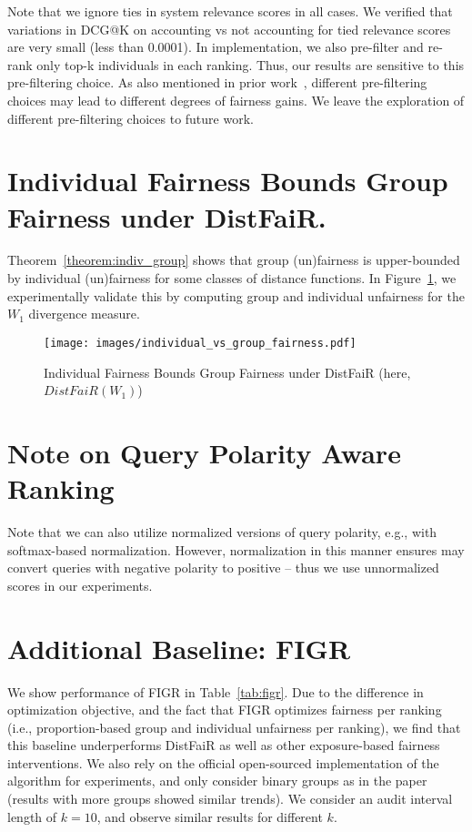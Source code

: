 Note that we ignore ties in system relevance scores in all cases. We verified that variations in DCG@K on accounting vs not accounting for tied relevance scores are very small (less than 0.0001). In implementation, we also pre-filter and re-rank only top-k individuals in each ranking. Thus,  our results are sensitive to this pre-filtering choice. As also mentioned in prior work~\cite{biega2018equity}, different pre-filtering choices may lead to different degrees of fairness gains. We leave the exploration of different pre-filtering choices to future work.


\section{Individual Fairness Bounds Group Fairness under DistFaiR.}
\label{sec:fairness_bounds}
Theorem~\ref{theorem:indiv_group} shows that group (un)fairness is upper-bounded by individual (un)fairness for some classes of distance functions. In Figure~\ref{fig:indiv_group}, we experimentally validate this by computing group and individual unfairness for the $W_1$ divergence measure.

\begin{figure}[ht!]
    \centering
    \texttt{[image: images/individual\_vs\_group\_fairness.pdf]}
    \caption{Individual Fairness Bounds Group Fairness under DistFaiR (here, $DistFaiR(W_1)$)}
    \label{fig:indiv_group}
\end{figure}


\section{Note on Query Polarity Aware Ranking}
Note that we can also utilize normalized versions of query polarity, e.g., with softmax-based normalization.  However, normalization in this manner ensures may convert queries with negative polarity to positive -- thus we use unnormalized scores in our experiments. 


\section{Additional Baseline: FIGR}

We show performance of FIGR in Table~\ref{tab:figr}. Due to the difference in optimization objective, and the fact that FIGR optimizes fairness per ranking (i.e., proportion-based group and individual unfairness per ranking), we find that this baseline underperforms DistFaiR as well as other exposure-based fairness interventions. We also rely on the official open-sourced implementation of the algorithm for experiments, and only consider binary groups as in the paper (results with more groups showed similar trends). We consider an audit interval length of $k=10$, and observe similar results for different $k$.

